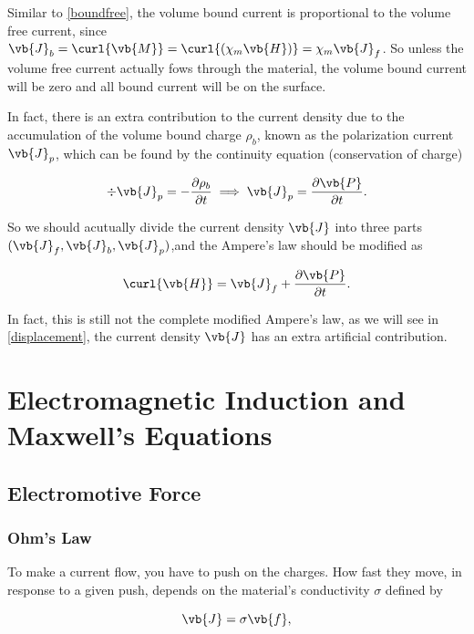 \documentclass[english,a4paper,12pt]{report}
\begin{document}
Similar to \cref{boundfree}, the volume bound current is proportional to the volume free current, since \(\vb{J} _{b} = \curl{\vb{M} } = \curl{(\chi _{m}\vb{H}  )} = \chi _{m}\vb{J} _{f} \). So unless the volume free current actually fows through the material, the volume bound current will be zero and all bound current will be on the surface.  

In fact, there is an extra contribution to the current density due to the accumulation of the volume bound charge \(\rho _{b} \), known as the polarization current \(\vb{J} _{p} \), which can be found by the continuity equation (conservation of charge) 

\begin{equation}
    \div{\vb{J} _{p} } = - \frac{\partial \rho _{b} }{\partial t} \implies  \vb{J} _{p} = \frac{\partial \vb{P} }{\partial t}.
\end{equation}

So we should acutually divide the current density \(\vb{J} \) into three parts \((\vb{J} _{f}, \vb{J} _{b}, \vb{J} _{p})\),and the Ampere's law should be modified as 

\begin{equation}
    \curl{\vb{H} } = \vb{J} _{f} + \frac{\partial \vb{P} }{\partial t}. \label{comampere} 
\end{equation}

In fact, this is still not the complete modified Ampere's law, as we will see in \cref{displacement}, the current density \(\vb{J} \) has an extra artificial contribution.  


\chapter{Electromagnetic Induction and Maxwell's Equations}

\section{Electromotive Force} \label{emf} 

\subsection{Ohm's Law} \label{ohmlaw} 

To make a current flow, you have to push on the charges. How fast they move, in response to a given push, depends on the material's conductivity \(\sigma \) defined by 

\begin{equation}
    \vb{J} = \sigma \vb{f} , \label{ohm} 
\end{equation}
\end{document}
